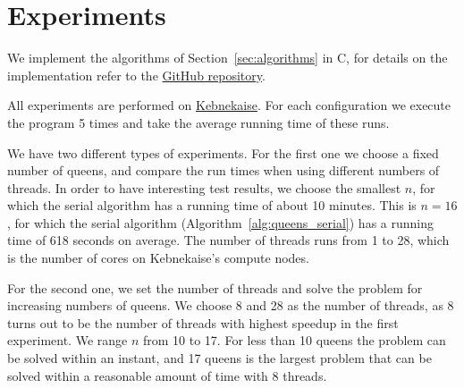 \section{Experiments}

We implement the algorithms of Section~\ref{sec:algorithms} in C, for details on the implementation refer to the \href{https://github.com/muesal/n-queens-openmp}{GitHub repository}.

All experiments are performed on \href{https://www.hpc2n.umu.se/}{Kebnekaise}.
For each configuration we execute the program 5 times and take the average running time of these runs.

We have two different types of experiments.
For the first one we choose a fixed number of queens, and compare the run times when using different numbers of threads.
In order to have interesting test results, we choose the smallest $n$, for which the serial algorithm has a running time of about 10 minutes. 
This is $n=16$, for which the serial algorithm (Algorithm~\ref{alg:queens_serial}) has a running time of 618 seconds on average.
The number of threads runs from 1 to 28, which is the number of cores on Kebnekaise's compute nodes.

For the second one, we set the number of threads and solve the problem for increasing numbers of queens.
We choose 8 and 28 as the number of threads, as 8 turns out to be the number of threads with highest speedup in the first experiment.
We range $n$ from 10 to 17.
For less than 10 queens the problem can be solved within an instant, and 17 queens is the largest problem that can be solved within a reasonable amount of time with 8 threads.
